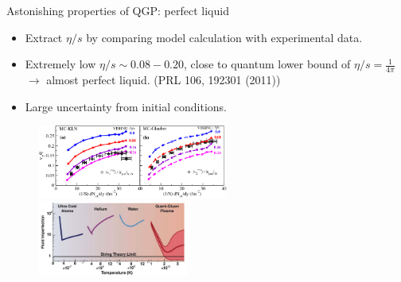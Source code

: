 \documentclass[11pt]{beamer}
\begin{document}
\begin{frame}{Astonishing properties of QGP: perfect liquid}
\begin{itemize}
\item Extract $\eta/s$ by comparing model calculation with experimental data.
\item Extremely low $\eta/s \sim 0.08 - 0.20$, close to quantum lower bound of $\eta/s = \frac{1}{4\pi}$ $\rightarrow$ almost perfect liquid. (PRL 106, 192301 (2011))
\item \color{red}Large uncertainty from initial conditions.
\end{itemize}
\begin{center}
\begin{figure}
\includegraphics[width=0.56\textwidth]{./pics/song.png}
\includegraphics[width=0.44\textwidth]{./pics/eta_s.png}
\end{figure}
\end{center}
\end{frame}

\end{document}
